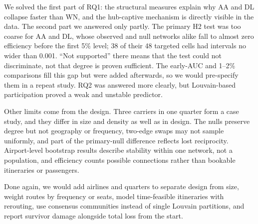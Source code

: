 \documentclass[12pt, a4paper]{article}
\begin{document}
We solved the first part of RQ1: the structural measures explain why AA and DL collapse faster than WN, and the hub-captive mechanism is directly visible in the data. The second part we answered only partly. The primary H2 test was too coarse for AA and DL, whose observed and null networks alike fall to almost zero efficiency before the first 5\% level; 38 of their 48 targeted cells had intervals no wider than 0.001. ``Not supported'' there means that the test could not discriminate, not that degree is proven sufficient. The early-AUC and 1--2\% comparisons fill this gap but were added afterwards, so we would pre-specify them in a repeat study. RQ2 was answered more clearly, but Louvain-based participation proved a weak and unstable predictor.

Other limits come from the design. Three carriers in one quarter form a case study, and they differ in size and density as well as in design. The nulls preserve degree but not geography or frequency, two-edge swaps may not sample uniformly, and part of the primary-null difference reflects lost reciprocity. Airport-level bootstrap results describe stability within one network, not a population, and efficiency counts possible connections rather than bookable itineraries or passengers.

Done again, we would add airlines and quarters to separate design from size, weight routes by frequency or seats, model time-feasible itineraries with rerouting, use consensus communities instead of single Louvain partitions, and report survivor damage alongside total loss from the start.
\end{document}
